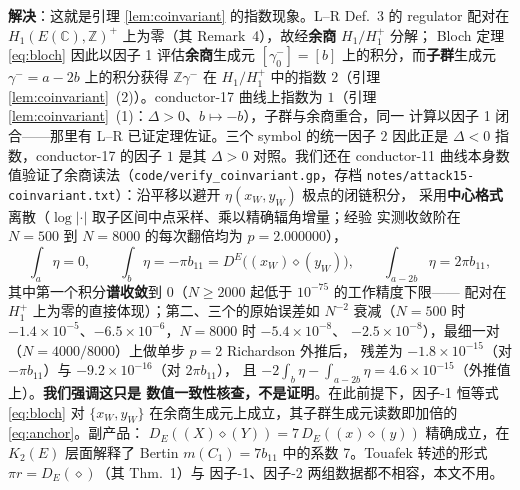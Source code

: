 \documentclass[11pt,a4paper]{ctexart}
\theoremstyle{remark}
\newcommand{\ZZ}{\mathbb{Z}}
\newcommand{\CC}{\mathbb{C}}
\newcommand{\bN}{b_{11}}
\begin{document}
\textbf{解决}：这就是引理 \ref{lem:coinvariant} 的指数现象。L--R Def.~3 的 regulator
配对在 $H_1(E(\CC),\ZZ)^+$ 上为零（其 Remark~4），故经\textbf{余商} $H_1/H_1^+$ 分解；
Bloch 定理 \eqref{eq:bloch} 因此以因子 1 评估\textbf{余商}生成元 $[\gamma^-_0]=[b]$
上的积分，而\textbf{子群}生成元 $\gamma^-=a-2b$ 上的积分获得 $\ZZ\gamma^-$ 在
$H_1/H_1^+$ 中的指数 $2$（引理 \ref{lem:coinvariant}~(2)）。conductor-17 曲线上指数为
$1$（引理 \ref{lem:coinvariant}~(1)：$\Delta>0$、$b\mapsto-b$），子群与余商重合，同一
计算以因子 1 闭合——那里有 L--R 已证定理佐证。三个 symbol 的统一因子 $2$ 因此正是
$\Delta<0$ 指数，conductor-17 的因子 $1$ 是其 $\Delta>0$ 对照。我们还在 conductor-11
曲线本身数值验证了余商读法（\texttt{code/verify\_coinvariant.gp}，存档
\texttt{notes/attack15-coinvariant.txt}）：沿平移以避开 $\eta(x_W,y_W)$ 极点的闭链积分，
采用\textbf{中心格式}离散（$\log|\cdot|$ 取子区间中点采样、乘以精确辐角增量；经验
实测收敛阶在 $N=500$ 到 $N=8000$ 的每次翻倍均为 $p=2.000000$），
\[
\textstyle\int_a\eta=0,\qquad
\int_b\eta=-\pi\bN=D^E\big((x_W)\diamond(y_W)\big),\qquad
\int_{a-2b}\eta=2\pi\bN,
\]
其中第一个积分\textbf{谱收敛}到 $0$（$N\ge2000$ 起低于 $10^{-75}$ 的工作精度下限——
配对在 $H_1^+$ 上为零的直接体现）；第二、三个的原始误差如 $N^{-2}$ 衰减（$N=500$ 时
$-1.4\times10^{-5}$、$-6.5\times10^{-6}$，$N=8000$ 时 $-5.4\times10^{-8}$、
$-2.5\times10^{-8}$），最细一对（$N=4000/8000$）上做单步 $p=2$ Richardson 外推后，
残差为 $-1.8\times10^{-15}$（对 $-\pi\bN$）与 $-9.2\times10^{-16}$（对 $2\pi\bN$），
且 $-2\int_b\eta-\int_{a-2b}\eta=4.6\times10^{-15}$（外推值上）。\textbf{我们强调这只是
数值一致性核查，不是证明}。在此前提下，因子-1 恒等式 \eqref{eq:bloch} 对
$\{x_W,y_W\}$ 在余商生成元上成立，其子群生成元读数即加倍的 \eqref{eq:anchor}。副产品：
$D_E((X)\diamond(Y))=7\,D_E((x)\diamond(y))$ 精确成立，在 $K_2(E)$ 层面解释了 Bertin
$m(C_1)=7\bN$ 中的系数 7。Touafek 转述的形式 $\pi r=D_E(\diamond)$（其 Thm.~1）与
因子-1、因子-2 两组数据都不相容，本文不用。
\end{document}
